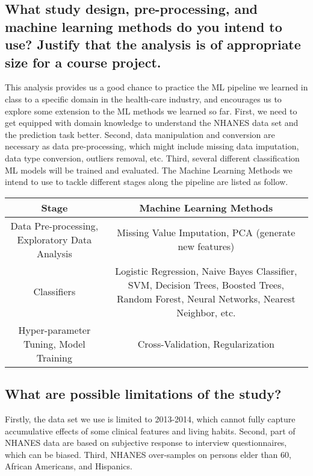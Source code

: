 \documentclass[twoside,11pt]{article}
\begin{document}
\subsection{What study design, pre-processing, and machine learning methods do you intend to use? Justify that the analysis is of appropriate size for a course project.}
This analysis provides us a good chance to practice the ML pipeline we learned in class to a specific domain in the health-care industry, and encourages us to explore some extension to the ML methods we learned so far. First, we need to get equipped with domain knowledge to understand the NHANES data set and the prediction task better. Second, data manipulation and conversion are necessary as data pre-processing, which might include missing data imputation, data type conversion, outliers removal, etc. Third, several different classification ML models will be trained and evaluated. The Machine Learning Methods we intend to use to tackle different stages along the pipeline are listed as follow.
\begin{table}[!ht]
\setlength\extrarowheight{2pt} %
\begin{tabularx}{\textwidth}{|C|C|}
 \hline
Stage&Machine Learning Methods\\
 \hline
 Data Pre-processing, Exploratory Data Analysis & Missing Value Imputation, PCA (generate new features)\\
 \hline 
 Classifiers & Logistic Regression, Naive Bayes Classifier, SVM, Decision Trees, Boosted Trees, Random Forest, Neural Networks, Nearest Neighbor, etc.  \\
 \hline
 Hyper-parameter Tuning, Model Training & Cross-Validation, Regularization\\
 \hline

\end{tabularx}
\end{table}

\subsection{What are possible limitations of the study?}
Firstly, the data set we use is limited to 2013-2014, which cannot fully capture accumulative effects of some clinical features and living habits. Second, part of NHANES data are based on subjective response to interview questionnaires, which can be biased. Third, NHANES over-samples on persons elder than 60, African Americans, and Hispanics. 
\end{document}
